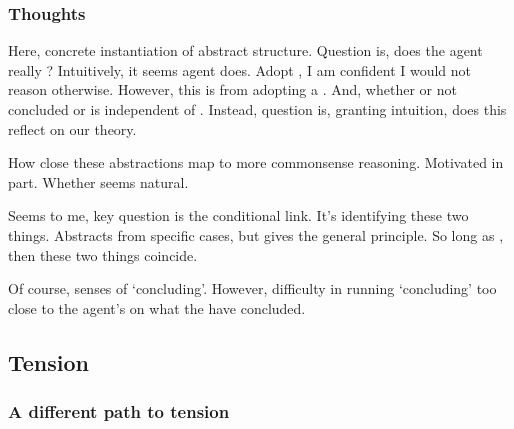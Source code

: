 \subsubsection{Thoughts}
\label{sec:thoughts}

\begin{note}[Difficulty]
  Here, concrete instantiation of abstract structure.
  Question is, does the agent really \csN{}?
  Intuitively, it seems agent does.
  Adopt \stance{}, I am confident I would not reason otherwise.
  However, this is from adopting a \stance{}.
  And, whether or not concluded or \csVed{} is independent of \stance{}.
  Instead, question is, granting intuition, does this \stance{} reflect on our theory.

  How close these abstractions map to more commonsense reasoning.
  Motivated in part.
  Whether \csN{} seems natural.

  Seems to me, key question is the conditional link.
  It's identifying these two things.
  Abstracts from specific cases, but gives the general principle.
  So long as \csN{}, then these two things coincide.

  Of course, senses of `concluding'.
  However, difficulty in running `concluding' too close to the agent's \stance{} on what the have concluded.
\end{note}

\subsection{Tension}
\label{sec:overview:tension:subsection}


\subsubsection{A different path to tension}
\label{sec:diff-path-tens}

